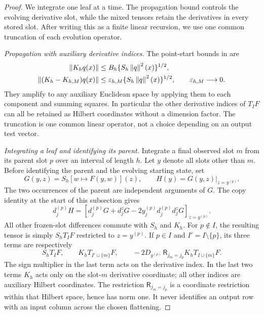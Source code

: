 \begin{proof}
We integrate one leaf at a time.  The propagation bound controls the
evolving derivative slot, while the mixed tensors retain the derivatives
in every stored slot.  After writing this as a finite linear recursion,
we use one common truncation of each evolution operator.

\emph{Propagation with auxiliary derivative indices.}
The point-start bounds in  are
\begin{align}
 \left\lVert K_hq(x)\right\rVert&\le B_h\{S_h\left\lVert q\right\rVert^2(x)\}^{1/2},\notag\\
 \left\lVert (K_h-K_{h,M})q(x)\right\rVert
   &\le\varepsilon_{h,M}\{S_h\left\lVert q\right\rVert^2(x)\}^{1/2},
 \qquad \varepsilon_{h,M}\longrightarrow0.
 \label{eq:path-amplified-tail}
\end{align}
They amplify to any auxiliary Euclidean space by applying them to
each component and summing squares.  In particular the other derivative
indices of $T_IF$ can all be retained as Hilbert coordinates without
a dimension factor.  The truncation is one common linear operator,
not a choice depending on an output test vector.

\emph{Integrating a leaf and identifying its parent.}
Integrate a final observed slot $m$ from its parent slot $p$ over an
interval of length $h$.  Let $y$ denote all slots other than $m$.
Before identifying the parent and the evolving starting state, set
\[
 G(y,z)=S_h[w\mapsto F(y,w)](z),
 \qquad H(y)=G(y,z)\big|_{z=y^{(p)}}.
\]
The two occurrences of the parent are independent arguments of $G$.
The copy identity at the start of this subsection gives
\begin{equation}
 d_j^{(p)}H
 =\left[d_j^{(p)}G+d_j^zG
           -2y_j^{(p)}d_j^{(p)}d_j^zG\right]_{z=y^{(p)}}.
 \label{eq:path-copy-difference}
\end{equation}
All other frozen-slot differences commute with $S_h$ and $K_h$.
For $p\notin I$, the resulting tensor is simply $S_hT_IF$ restricted
to $z=y^{(p)}$.  If $p\in I$ and $I'=I\setminus\{p\}$, its three
terms are respectively
\begin{equation}
 S_hT_IF,\qquad
 K_hT_{I'\cup\{m\}}F,\qquad
 -2D_{y^{(p)}}\,\mathsf R_{j_m=j_p}
                         K_hT_{I\cup\{m\}}F.
 \label{eq:path-copy-tensors}
\end{equation}
The sign multiplier in the last term acts on the derivative index.
In the last two terms $K_h$ acts only on the slot-$m$ derivative
coordinate; all other indices are auxiliary Hilbert coordinates.
The restriction $\mathsf R_{j_m=j_p}$ is a coordinate restriction
within that Hilbert space, hence has norm one.  It never identifies
an output row with an input column across the chosen flattening.


\end{proof}
